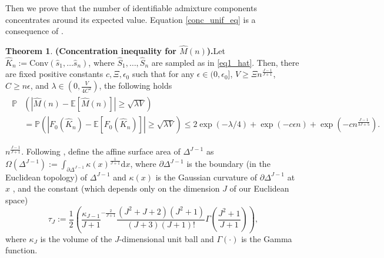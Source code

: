 \documentclass[12pt, reqno]{amsart}
\theoremstyle{definition}
\newtheorem{theorem}{Theorem}%
\begin{document}
Then we prove that the number of identifiable admixture components concentrates around its expected value. Equation \eqref{conc_unif_eq} is a consequence of \cite[Theorem 2.11, Section 7]{vu}.


\begin{theorem}{\textbf{(Concentration inequality for $\hat{M}(n)$).}}\label{conc_unif_thm}
    Let $\hat{K}_n:=\text{Conv}(\hat{s}_1,\ldots\hat{s}_n)$, where $\hat{S}_1,\ldots,\hat{S}_n$ are sampled as in \eqref{eq1_hat}. Then, there are fixed positive constants $c,\Xi,\epsilon_0$ such that for any $\epsilon\in(0,\epsilon_0]$, $V\geq \Xi n^{\frac{J-1}{J+1}}$, $C\geq n\epsilon$, and $\lambda\in(0,\frac{V}{4C^2})$, the following holds
    \begin{align}\label{conc_unif_eq}
        \begin{split}
            \mathbb{P}&\left( \left| \hat{M}(n) -\mathbb{E}[\hat{M}(n)] \right| \geq \sqrt{\lambda V} \right)\\
            &=\mathbb{P}\left( \left| F_0(\hat{K}_n) -\mathbb{E}[F_0(\hat{K}_n)] \right| \geq \sqrt{\lambda V} \right) \leq 2 \exp(-\lambda/4)+\exp(-c\epsilon n) + \exp\left(-cn^\frac{J-1}{3J+5}\right).
        \end{split}  
    \end{align}
\end{theorem}
























\iffalse
$n^{\frac{J-1}{J+1}}$. Following \cite[page 2137]{reitzner_aop}, define the affine
surface area of $\Delta^{J-1}$ as $\Omega(\Delta^{J-1}):=\int_{\partial \Delta^{J-1}} \kappa(x)^{\frac{1}{J+1}}\text{d}x$, where $\partial \Delta^{J-1}$ is the boundary (in the Euclidean topology) of $\Delta^{J-1}$ and $\kappa(x)$ is the Gaussian curvature of $\partial \Delta^{J-1}$ at $x$ \cite{kuhnel}, and the constant (which depends only on the dimension $J$ of our Euclidean space)
$$\tau_J:=\frac{1}{2}\left( \frac{\kappa_{J-1}}{J+1}^{-\frac{2}{J+1}} \frac{(J^2+J+2)(J^2+1)}{(J+3)(J+1)!} \Gamma\left( \frac{J^2+1}{J+1} \right) \right),$$
where $\kappa_{J}$ is the volume of the $J$-dimensional unit ball and $\Gamma(\cdot)$ is the Gamma function.
\end{document}

